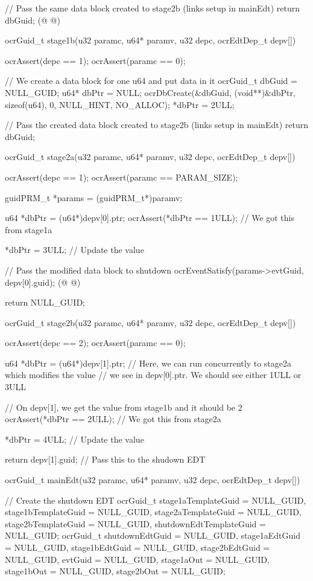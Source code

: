 \begin{ocrsnip}
{    // Pass the same data block created to stage2b (links setup in mainEdt)
    return dbGuid; (@ \label{line:EdtGuidReturn} @)
}

ocrGuid_t stage1b(u32 paramc, u64* paramv, u32 depc, ocrEdtDep_t depv[]) {
    ocrAssert(depc == 1);
    ocrAssert(paramc == 0);

    // We create a data block for one u64 and put data in it
    ocrGuid_t dbGuid = NULL_GUID;
    u64* dbPtr = NULL;
    ocrDbCreate(&dbGuid, (void**)&dbPtr, sizeof(u64), 0, NULL_HINT, NO_ALLOC);
    *dbPtr = 2ULL;

    // Pass the created data block created to stage2b (links setup in mainEdt)
    return dbGuid;
}

ocrGuid_t stage2a(u32 paramc, u64* paramv, u32 depc, ocrEdtDep_t depv[]) {
    ocrAssert(depc == 1);
    ocrAssert(paramc == PARAM_SIZE);

    guidPRM_t *params = (guidPRM_t*)paramv;

    u64 *dbPtr = (u64*)depv[0].ptr;
    ocrAssert(*dbPtr == 1ULL); // We got this from stage1a

    *dbPtr = 3ULL; // Update the value

    // Pass the modified data block to shutdown
    ocrEventSatisfy(params->evtGuid, depv[0].guid); (@ \label{line:expSatisfy} @)

    return NULL_GUID;
}

ocrGuid_t stage2b(u32 paramc, u64* paramv, u32 depc, ocrEdtDep_t depv[]) {
    ocrAssert(depc == 2);
    ocrAssert(paramc == 0);

    u64 *dbPtr = (u64*)depv[1].ptr;
    // Here, we can run concurrently to stage2a which modifies the value
    // we see in depv[0].ptr. We should see either 1ULL or 3ULL

    // On depv[1], we get the value from stage1b and it should be 2
    ocrAssert(*dbPtr == 2ULL); // We got this from stage2a

    *dbPtr = 4ULL; // Update the value

    return depv[1].guid; // Pass this to the shudown EDT
}


ocrGuid_t mainEdt(u32 paramc, u64* paramv, u32 depc, ocrEdtDep_t depv[]) {

    // Create the shutdown EDT
    ocrGuid_t stage1aTemplateGuid = NULL_GUID, stage1bTemplateGuid = NULL_GUID,
        stage2aTemplateGuid = NULL_GUID, stage2bTemplateGuid = NULL_GUID,
        shutdownEdtTemplateGuid = NULL_GUID;
    ocrGuid_t shutdownEdtGuid = NULL_GUID, stage1aEdtGuid = NULL_GUID,
        stage1bEdtGuid = NULL_GUID, stage2bEdtGuid = NULL_GUID,
        evtGuid = NULL_GUID, stage1aOut = NULL_GUID, stage1bOut = NULL_GUID,
        stage2bOut = NULL_GUID;

}
\end{ocrsnip}

